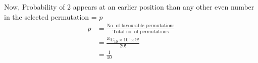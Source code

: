 Now, Probability of 2 appears at an earlier position than any other even number in the selected permutation = \(p\)\newline
\begin{align}
    p &= \frac{\text{No. of favourable permutations}}{\text{Total no. of permutations}}\nonumber\\
    &= \frac{{}^{20}C_{10}\times10!\times9!}{20!}\\
    &= \frac{1}{10}\\\nonumber
\end{align}

